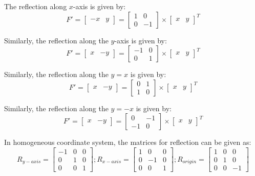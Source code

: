 The reflection along $x$-axis is given by:
$$F' = \begin{bmatrix}
    -x & y
\end{bmatrix} = \begin{bmatrix}
    1 & 0\\
    0 & -1
\end{bmatrix} \times \begin{bmatrix}
    x & y
\end{bmatrix}^{T}$$

Similarly, the reflection along the $y$-axis is given by:
$$F' = \begin{bmatrix}
    x & -y
\end{bmatrix} = \begin{bmatrix}
    -1 & 0\\
    0 & 1
\end{bmatrix} \times \begin{bmatrix}
    x & y
\end{bmatrix}^{T}$$

Similarly, the reflection along the $y = x$ is given by:
$$F' = \begin{bmatrix}
    x & -y
\end{bmatrix} = \begin{bmatrix}
    0 & 1\\
    1 & 0
\end{bmatrix} \times \begin{bmatrix}
    x & y
\end{bmatrix}^{T}$$

Similarly, the reflection along the $y=-x$ is given by:
$$F' = \begin{bmatrix}
    x & -y
\end{bmatrix} = \begin{bmatrix}
    0 & -1\\
    -1 & 0
\end{bmatrix} \times \begin{bmatrix}
    x & y
\end{bmatrix}^{T}$$


In homogeneous coordinate system, the matrices for reflection can be given as:
\begin{equation*}
    R_{y-axis} = \begin{bmatrix}
        -1 & 0 & 0\\
        0  & 1 & 0\\
        0  & 0 & 1
    \end{bmatrix} ;
    R_{x-axis} = \begin{bmatrix}
        1 & 0  & 0\\
        0 & -1 & 0\\
        0 & 0  & 1
    \end{bmatrix} ;
    R_{origin} = \begin{bmatrix}
        1 & 0 & 0\\
        0 & 1 & 0\\
        0 & 0 & -1
    \end{bmatrix}
\end{equation*}